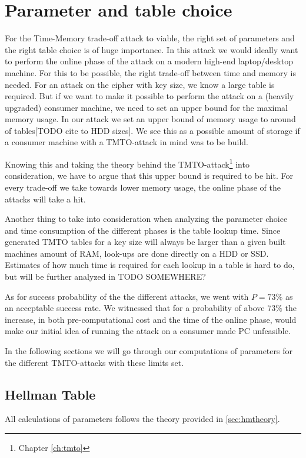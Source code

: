 \chapter{Parameter and table choice}
\label{ch:param}
For the Time-Memory trade-off attack to viable, the right set of
parameters and the right table choice is of huge importance. In this
attack we would ideally want to perform the online phase of the  attack on a modern
high-end laptop/desktop machine. For this to be possible, the right
trade-off between time and memory is needed. For an attack on the
cipher with  key size, we know a large table is required. But if
we want to make it possible to perform the attack on a (heavily
upgraded) consumer
machine, we need to set an upper bound for the maximal memory
usage. In our attack we set an upper bound of memory usage to around
 of tables[TODO cite to HDD sizes]. We see this as a possible amount of storage if a
consumer machine with a TMTO-attack in mind was to be build.

Knowing this and taking the theory behind the
TMTO-attack\footnote{Chapter \ref{ch:tmto}} into consideration, we
have to argue that this upper bound is required to be hit. For every
trade-off we take towards lower memory usage, the online phase of the
attacks will take a hit.

Another thing to take into consideration when analyzing the parameter
choice and time consumption of the different phases is the table lookup
time. Since generated TMTO tables for a  key size will
always be larger than a given built machines amount of RAM, look-ups are
done directly on a HDD or SSD. Estimates of how much time is required
for each lookup in a table is hard to do, but will be further analyzed
in TODO SOMEWHERE?

As for success probability of the
the different attacks, we went with $P = 73\%$ as an acceptable
success rate.
We witnessed that for a probability of above $73\%$ the increase,
in both pre-computational cost and the time of the online phase, would
make our initial idea of running the attack on a consumer made PC
unfeasible.

In the following sections we will go through our computations of
parameters for the different TMTO-attacks with these limits set.

\section{Hellman Table}
All calculations of parameters follows the theory provided in
\ref{sec:hmtheory}.

